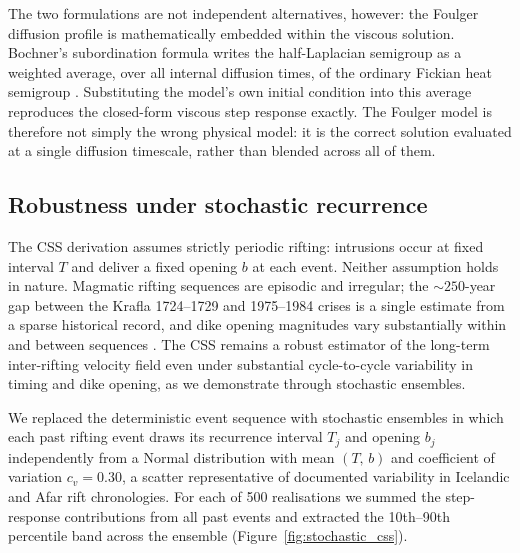 \documentclass[extra]{gji}
\begin{document}
The two formulations are not independent alternatives, however: the
Foulger diffusion profile is mathematically embedded within the viscous
solution. Bochner's subordination formula writes the half-Laplacian
semigroup as a weighted average, over all internal diffusion times, of the
ordinary Fickian heat semigroup \citep{metzler2000random}. Substituting the
model's own initial condition into this average reproduces the closed-form
viscous step response exactly. The Foulger model is therefore not simply
the wrong physical model: it is the correct solution evaluated at a single
diffusion timescale, rather than blended across all of them.

\subsection{Robustness under stochastic recurrence}
\label{sec:disc_stochastic}

The CSS derivation assumes strictly periodic rifting: intrusions occur at
fixed interval $T$ and deliver a fixed opening $b$ at each event.
Neither assumption holds in nature.  Magmatic rifting sequences are episodic
and irregular; the $\sim250$-year gap between the Krafla 1724--1729 and
1975--1984 crises is a single estimate from a sparse historical record, and
dike opening magnitudes vary substantially within and between sequences
\citep{thordarson2007volcanism}.  The CSS remains a robust estimator of
the long-term inter-rifting velocity field even under substantial
cycle-to-cycle variability in timing and dike opening, as we demonstrate
through stochastic ensembles.

We replaced the deterministic event sequence with stochastic ensembles in
which each past rifting event draws its recurrence interval $T_j$ and
opening $b_j$ independently from a Normal distribution with mean
$(T,\,b)$ and coefficient of variation $c_v = 0.30$, a scatter
representative of documented variability in Icelandic and Afar rift
chronologies.  For each of 500 realisations we summed the step-response
contributions from all past events and extracted the 10th--90th percentile
band across the ensemble (Figure~\ref{fig:stochastic_css}).
\end{document}
